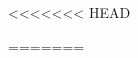 \documentclass{../../oss-apphys-exam}
\begin{document}
\genheader


\genmultidirections


\raggedcolumns

\begin{multicols*}{2}
<<<<<<< HEAD
  \begin{questions}

%
%      
%
%    
=======


\end{questions}
\end{multicols*}
\end{document}
